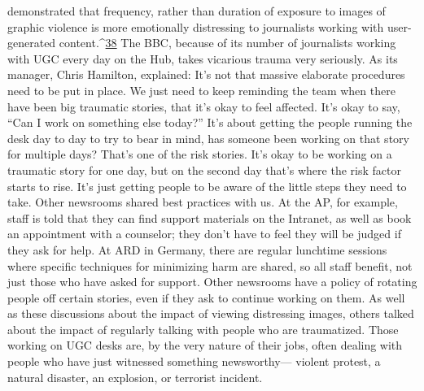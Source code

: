 \begin{enumerate}
demonstrated that frequency, rather than duration of exposure to images of
graphic violence is more emotionally distressing to journalists working with
user-generated content.^{\href{#endnotes}{38}}
The BBC, because of its number of journalists working with UGC every day
on the Hub, takes vicarious trauma very seriously. As its manager, Chris
Hamilton, explained:
It's not that massive elaborate procedures need to be put in place.
We just need to keep reminding the team when there have been big
traumatic stories, that it's okay to feel affected. It's okay to say, ``Can I
work on something else today?'' It's about getting the people running
the desk day to day to try to bear in mind, has someone been working
on that story for multiple days? That's one of the risk stories. It's okay
to be working on a traumatic story for one day, but on the second day
that's where the risk factor starts to rise. It's just getting people to be
aware of the little steps they need to take.
Other newsrooms shared best practices with us. At the AP, for example,
staff is told that they can find support materials on the Intranet, as well as
book an appointment with a counselor; they don't have to feel they will be
judged if they ask for help. At ARD in Germany, there are regular lunchtime
sessions where specific techniques for minimizing harm are shared, so all
staff benefit, not just those who have asked for support. Other newsrooms
have a policy of rotating people off certain stories, even if they ask to continue
working on them.
As well as these discussions about the impact of viewing distressing images,
others talked about the impact of regularly talking with people who are traumatized.
Those working on UGC desks are, by the very nature of their jobs,
often dealing with people who have just witnessed something newsworthy—
violent protest, a natural disaster, an explosion, or terrorist incident.


\end{enumerate}
